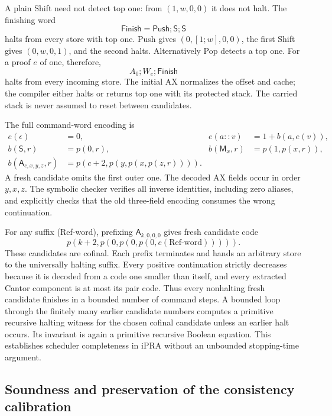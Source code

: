 A plain Shift need not detect top one: from $(1,w,0,0)$ it does not halt.
The finishing word
\[
 \mathsf{Finish}=\mathsf{Push};\mathsf S;\mathsf S
\]
halts from every store with top one.  Push gives
$(0,[1;w],0,0)$, the first Shift gives $(0,w,0,1)$, and the second halts.
Alternatively Pop detects a top one.  For a proof $e$ of one, therefore,
\[
                 A_0;W_e;\mathsf{Finish}                \tag{Ref-word}
\]
halts from every incoming store.  The initial AX normalizes the offset
and cache; the compiler either halts or returns top one with its protected
stack.  The carried stack is never assumed to reset between candidates.

The full command-word encoding is
\begin{align*}
 e(\epsilon)&=0,& e(a::v)&=1+b(a,e(v)),\\
 b(\mathsf S,r)&=p(0,r),&
 b(\mathsf M_x,r)&=p(1,p(x,r)),\\
 b(\mathsf A_{c,x,y,z},r)&=p(c+2,p(y,p(x,p(z,r)))).
\end{align*}
A fresh candidate omits the first outer one.  The decoded AX fields occur
in order $y,x,z$.  The symbolic checker verifies all inverse identities,
including zero aliases, and explicitly checks that the old three-field
encoding consumes the wrong continuation.

For any suffix (Ref-word), prefixing $\mathsf A_{k,0,0,0}$ gives fresh
candidate code
\[
       p(k+2,p(0,p(0,p(0,e(\text{Ref-word}))))).
\]
These candidates are cofinal.  Each prefix terminates and hands an
arbitrary store to the universally halting suffix.  Every positive
continuation strictly decreases because it is decoded from a code one
smaller than itself, and every extracted Cantor component is at most its
pair code.  Thus every nonhalting fresh candidate finishes in a bounded
number of command steps.  A bounded loop through the finitely many earlier
candidate numbers computes a primitive recursive halting witness for the
chosen cofinal candidate unless an earlier halt occurs.  Its invariant is
again a primitive recursive Boolean equation.  This establishes scheduler
completeness in iPRA without an unbounded stopping-time argument.

\subsection{Soundness and preservation of the consistency calibration}

